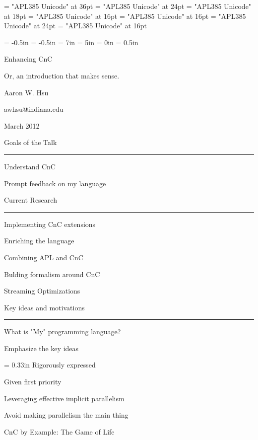 \def\majorstop#1{\null\vfill \centerline{\subtitlef #1}\par\vfill}
\def\newslide{\par\vfill\break}
\def\heading#1{\centerline{\headingf #1}\smallskip\hrule\medskip}

\font\titlef = "APL385 Unicode" at 36pt
\font\subtitlef = "APL385 Unicode" at 24pt
\font\authorf = "APL385 Unicode" at 18pt
\font\emailf = "APL385 Unicode" at 16pt
\font\datef = "APL385 Unicode" at 16pt
\font\headingf = "APL385 Unicode" at 24pt
\font\rm = "APL385 Unicode" at 16pt

\hoffset = -0.5in
\voffset = -0.5in
\hsize = 7in
\vsize = 5in
\parindent = 0in
\parskip = 0.5in

\null\rm\newslide

\null\vfill
\centerline{\titlef Enhancing CnC}
\centerline{\subtitlef Or, an introduction that makes sense.}
\bigskip
\centerline{\authorf Aaron W. Hsu}
\smallskip
\centerline{\emailf awhsu@indiana.edu}
\bigskip\bigskip
\centerline{ March 2012}

\newslide

\heading{Goals of the Talk}

Understand CnC

Prompt feedback on my language


\newslide

\heading{Current Research}

Implementing CnC extensions

Enriching the language

Combining APL and CnC

Bulding formalism around CnC

Streaming Optimizations

\newslide

\heading{Key ideas and motivations}

What is "My" programming language?

Emphasize the key ideas

{\parindent = 0.33in
Rigorously expressed

Given first priority\par}

Leveraging effective implicit parallelism

Avoid making parallelism the main thing

\newslide

\majorstop{CnC by Example: The Game of Life}

